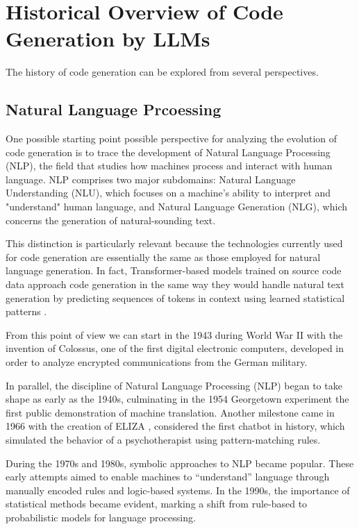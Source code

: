 \clearpage
\section{Historical Overview of Code Generation by LLMs}

The history of code generation can be explored from several 
perspectives. 

\subsection{Natural Language Prcoessing} %
One possible starting point possible perspective for 
analyzing the evolution of code generation is to trace 
the development of Natural Language Processing (NLP), 
the field that studies how machines process and interact 
with human language. NLP comprises two major subdomains: 
Natural Language Understanding (NLU), which focuses on a 
machine's ability to interpret and "understand" human language, 
and Natural Language Generation (NLG), which concerns the 
generation of natural-sounding text.

This distinction is particularly relevant because 
the technologies currently used for code generation 
are essentially the same as those employed for natural 
language generation. In fact, Transformer-based models 
trained on source code data approach code generation in 
the same way they would handle natural text generation 
by predicting sequences of tokens in context using learned 
statistical patterns \cite{vaswani2017attention}.

From this point of view we can start in the 1943 
during World War II with
the invention of Colossus, one of the first digital electronic computers, 
developed in order to analyze encrypted
communications from the German military.

In parallel, the discipline of Natural Language Processing 
(NLP) began to take shape as early as the 1940s, culminating 
in the 1954 Georgetown experiment the first public demonstration 
of machine translation. Another milestone came in 1966 with the 
creation of ELIZA \cite{weizenbaum1966eliza}, considered the first 
chatbot in history, which simulated the behavior of a psychotherapist 
using pattern-matching rules.

During the 1970s and 1980s, symbolic approaches to NLP became popular. 
These early attempts aimed to enable machines to “understand” language 
through manually encoded rules and logic-based systems. In the 1990s, 
the importance of statistical methods became evident, marking a shift 
from rule-based to probabilistic models for language processing.

